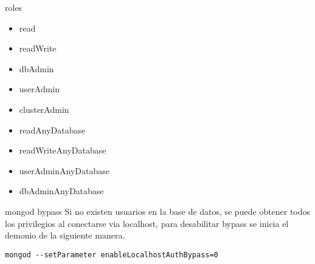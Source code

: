 \documentclass[12pt]{beamer}
\begin{document}
\begin{frame}[fragile]{roles}
\begin{multicols}{2}

  \begin{itemize}
    \item read

    \item readWrite

    \item dbAdmin

    \item userAdmin

    \item clusterAdmin

    \item readAnyDatabase

    \item readWriteAnyDatabase

    \item userAdminAnyDatabase

    \item dbAdminAnyDatabase
    
  \end{itemize}
\end{multicols}
\end{frame}


\begin{frame}[fragile]{mongod bypass}
Si no existen usuarios en la base de datos, se puede obtener todos los
privilegios al conectarse via localhost, para desabilitar bypass se inicia el
demonio de la siguiente manera.

\begin{verbatim}
mongod --setParameter enableLocalhostAuthBypass=0
\end{verbatim}
\end{frame}


\newcommand{\putlink}[1]{%
   \pgfsetlinewidth{1.4pt}%
   \pgfsetendarrow{\pgfarrowtriangle{4pt}}%
   \pgfline{\pgfxy(1,1)}{\pgfxy(#1,1)}
}
\end{document}
